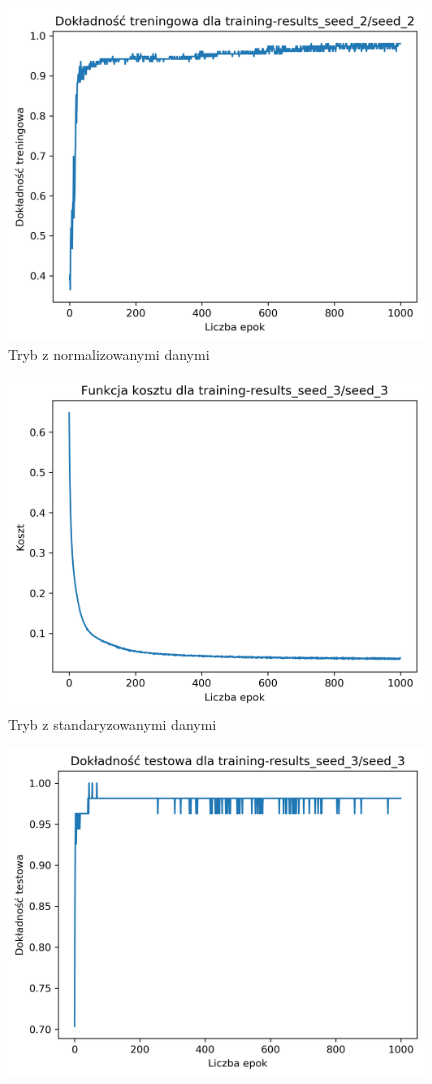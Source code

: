 \documentclass{classrep}
\begin{document}
{{{\begin{figure}[!htbp]
                    \includegraphics[width=110mm]{wykresy/seed_2_training-accuracy.png}
                    \caption{Tryb z normalizowanymi danymi}
                \end{figure}
                \FloatBarrier
                \begin{figure}[!htbp]
                    \centering
                    \includegraphics[width=110mm]{wykresy/seed_3_cost.png}
                    \caption{Tryb z standaryzowanymi danymi}
                \end{figure}
                \begin{figure}[!htbp]
                    \centering
                    \includegraphics[width=110mm]{wykresy/seed_3_testing-accuracy.png}

\end{figure}}}}
\end{document}
